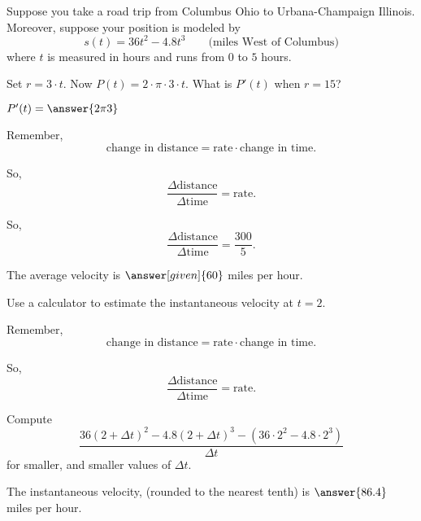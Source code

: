 \documentclass{ximera}
\begin{document}
Suppose you take a road trip from Columbus Ohio to Urbana-Champaign
Illinois. Moreover, suppose your position is modeled by
\[
s(t) = 36t^2 -4.8t^3 \qquad\text{(miles West of Columbus)} %
\]
where $t$ is measured in hours and runs from $0$ to $5$ hours. 

\begin{problem}\label{problem:whee}
  Set $r=3\cdot t$. Now $P(t) = 2\cdot \pi\cdot 3\cdot t$. What is
  $P'(t)$ when $r=15$?
  \begin{prompt}
    $P'(t)=\answer{2 \pi 3}$
  \end{prompt}
\end{problem}

\begin{problem}
  \label{problem:average-velocity}
  \begin{hint}
    Remember, 
    \[
    \text{change in distance} = \text{rate}\cdot\text{change in time}.
    \]
  \end{hint}
  \begin{hint}
    So, 
    \[
    \frac{\Delta\text{distance}}{\Delta\text{time}} = \text{rate}.
    \]
  \end{hint}
  \begin{hint}
    So, 
    \[
    \frac{\Delta\text{distance}}{\Delta\text{time}} = \frac{300}{5}.
    \]
  \end{hint}
  The average velocity is $\answer[given]{60}$ miles per hour.
\end{problem}


\begin{problem}
  Use a calculator to estimate the instantaneous velocity at $t=2$.
  \begin{hint}
    Remember, 
    \[
    \text{change in distance} = \text{rate}\cdot\text{change in time}.
    \]
  \end{hint}
  \begin{hint}
    So, 
    \[
    \frac{\Delta\text{distance}}{\Delta\text{time}} = \text{rate}.
    \]
  \end{hint}
  \begin{hint}
    Compute
    \[
    \frac{36(2+\Delta t)^2 -4.8(2+\Delta t)^3 -\left(36\cdot 2^2 -4.8\cdot 2^3\right) }{\Delta t}
    \]
    for smaller, and smaller values of $\Delta t$.
  \end{hint}
  \begin{prompt}
    The instantaneous velocity, (rounded to the nearest tenth) is $\answer{86.4}$ miles per hour.
  \end{prompt}
\end{problem}
\end{document}
